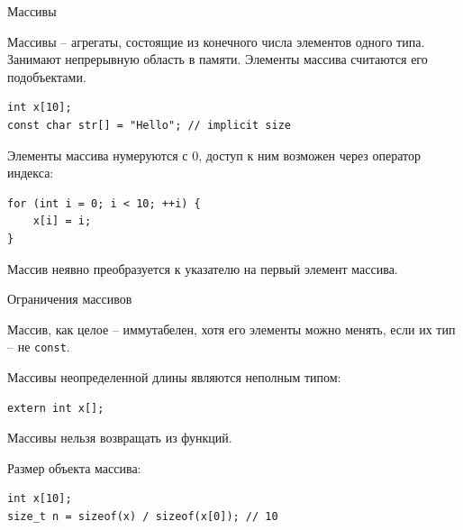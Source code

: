 \documentclass[unknownkeysallowed,xcolor=table]{beamer}
\begin{document}
\begin{frame}[fragile]{Массивы}

Массивы -- агрегаты, состоящие из конечного числа элементов одного типа.
Занимают непрерывную область в памяти.
Элементы массива считаются его подобъектами.

\vspace{0.5em}

\begin{lstlisting}
int x[10];
const char str[] = "Hello"; // implicit size
\end{lstlisting}

\vspace{1em}

Элементы массива нумеруются с 0, доступ к ним возможен через оператор индекса:

\vspace{0.5em}

\begin{lstlisting}
for (int i = 0; i < 10; ++i) {
    x[i] = i;
}
\end{lstlisting}

\vspace{0.5em}

Массив неявно преобразуется к указателю на первый элемент массива.

\end{frame}

\begin{frame}[fragile]{Ограничения массивов}

Массив, как целое -- иммутабелен, хотя его элементы можно менять, если их тип -- не \lstinline{const}.

\vspace{1.5em}

Массивы неопределенной длины являются неполным типом:

\vspace{1em}

\begin{lstlisting}
extern int x[];
\end{lstlisting}

\vspace{1em}

Массивы нельзя возвращать из функций.

\vspace{1em}

Размер объекта массива:

\begin{lstlisting}
int x[10];
size_t n = sizeof(x) / sizeof(x[0]); // 10
\end{lstlisting}

\end{frame}
\end{document}
